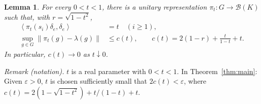\documentclass[11pt]{article}
\newtheorem{lemma}[theorem]{Lemma}
\theoremstyle{definition}
\theoremstyle{remark}
\newcommand{\B}{\mathcal B}
\newcommand{\norm}[1]{\left\|#1\right\|}
\newcommand{\inner}[2]{\left\langle #1,#2\right\rangle}
\begin{document}
\begin{lemma}\label{lem:tree}
For every $0<t<1$, there is a unitary representation $\pi_t:G\to\B(K)$
such that, with $r=\sqrt{1-t^2}$,
\begin{align}
\inner{\pi_t(s_i)\delta_e}{\delta_e}&=t\quad(i\ge1),\label{eq:coefficient}\\
\sup_{g\in G}\norm{\pi_t(g)-\lambda(g)}&\le c(t),\qquad
c(t)=2(1-r)+\frac{t}{1-t}+t.\label{eq:uniform}
\end{align}
In particular, $c(t)\to0$ as $t\downarrow0$.
\end{lemma}

\noindent\textit{Remark (notation).} $t$ is a real parameter with $0<t<1$. In Theorem~\ref{thm:main}: Given $\varepsilon>0$, $t$ is chosen sufficiently small that $2c(t)<\varepsilon$, where $c(t)=2(1-\sqrt{1-t^2})+t/(1-t)+t$.
\end{document}
